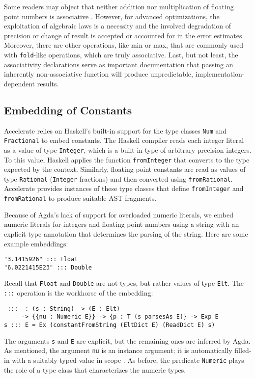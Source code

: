 \documentclass{llncs}
\begin{document}
Some readers may object that neither addition nor multiplication of
floating point numbers is associative
\cite{DBLP:journals/csur/Goldberg91}. However, for advanced
optimizations, the exploitation of algebraic laws is a necessity and
the involved degradation of precision or change of result is accepted
or accounted for in the error estimates. Moreover, there are
other operations, like min or max, that are commonly used with
\texttt{fold}-like operations, which are truly associative. Last, but
not least, the associativity declarations serve as important
documentation that passing an inherently non-associative function will
produce unpredictable, implementation-dependent results.

\subsection{Embedding of Constants}
\label{sec:embedding-constants}

Accelerate relies on Haskell's built-in support for the type classes
\texttt{Num} and \texttt{Fractional} to embed constants. The Haskell
compiler reads each integer literal as a value of type
\texttt{Integer}, which is a built-in type of arbitrary precision
integers. To this value, Haskell applies the function
\texttt{fromInteger} that converts to the type expected by the
context. Similarly, floating point constants are read as values of
type \texttt{Rational} (\texttt{Integer} fractions) and then converted
using \texttt{fromRational}. Accelerate provides instances of these
type classes that define \texttt{fromInteger} and
\texttt{fromRational} to produce suitable AST fragments.

Because of Agda's lack of support for overloaded numeric literals,
we embed numeric literals for integers and floating point numbers
using a string with an explicit type annotation that determines the
parsing of the string. Here are some example embeddings:
\begin{verbatim}
"3.1415926" ::: Float
"6.0221415E23" ::: Double
\end{verbatim}
Recall that \texttt{Float} and \texttt{Double} are not
types, but rather values of type \texttt{Elt}.
The \texttt{:::} operation is the workhorse of the embedding:
\begin{verbatim}
_:::_ : (s : String) -> (E : Elt) 
     -> {{nu : Numeric E}} -> {p : T (s parsesAs E)} -> Exp E
s ::: E = Ex (constantFromString (EltDict E) (ReadDict E) s)
\end{verbatim}
The arguments \texttt{s} and \texttt{E} are explicit, but the
remaining ones are inferred by Agda.
As mentioned, the argument \texttt{nu} is an instance argument; it is automatically
filled-in with a suitably typed value in scope
\cite{DevriesePiessens2011}. As before, the predicate 
\texttt{Numeric} plays the role of a type class that characterizes
the numeric types.
\end{document}

